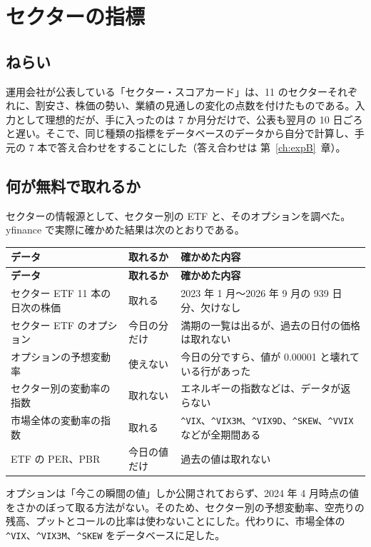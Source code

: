 \documentclass[xelatex,ja=standard,jafont=hiragino-pron,a4paper,10pt]{bxjsreport}
\newcommand{\code}[1]{\texttt{#1}}
\newcommand{\chapref}[1]{第~\ref{#1}~章}
\begin{document}
\chapter{セクターの指標}\label{ch:sector}

\section{ねらい}

運用会社が公表している「セクター・スコアカード」は、11 のセクターそれぞれに、割安さ、株価の勢い、業績の見通しの変化の点数を付けたものである。入力として理想的だが、手に入ったのは 7 か月分だけで、公表も翌月の 10 日ごろと遅い。そこで、同じ種類の指標をデータベースのデータから自分で計算し、手元の 7 本で答え合わせをすることにした（答え合わせは \chapref{ch:expB}）。

\section{何が無料で取れるか}

セクターの情報源として、セクター別の ETF と、そのオプションを調べた。yfinance で実際に確かめた結果は次のとおりである。

\begin{longtable}{p{5.60cm}p{2.40cm}p{6.40cm}}
\toprule
\textbf{データ} & \textbf{取れるか} & \textbf{確かめた内容} \\
\midrule
\endfirsthead
\toprule
\textbf{データ} & \textbf{取れるか} & \textbf{確かめた内容} \\
\midrule
\endhead
\bottomrule
\endfoot
セクター ETF 11 本の日次の株価 & 取れる & 2023 年 1 月〜2026 年 9 月の 939 日分、欠けなし \\
セクター ETF のオプション & 今日の分だけ & 満期の一覧は出るが、過去の日付の価格は取れない \\
オプションの予想変動率 & 使えない & 今日の分ですら、値が 0.00001 と壊れている行があった \\
セクター別の変動率の指数 & 取れない & エネルギーの指数などは、データが返らない \\
市場全体の変動率の指数 & 取れる & \code{\textasciicircum VIX}、\code{\textasciicircum VIX3M}、\code{\textasciicircum VIX9D}、\code{\textasciicircum SKEW}、\code{\textasciicircum VVIX} などが全期間ある \\
ETF の PER、PBR & 今日の値だけ & 過去の値は取れない \\
\end{longtable}

オプションは「今この瞬間の値」しか公開されておらず、2024 年 4 月時点の値をさかのぼって取る方法がない。そのため、セクター別の予想変動率、空売りの残高、プットとコールの比率は使わないことにした。代わりに、市場全体の \code{\textasciicircum VIX}、\code{\textasciicircum VIX3M}、\code{\textasciicircum SKEW} をデータベースに足した。
\end{document}
